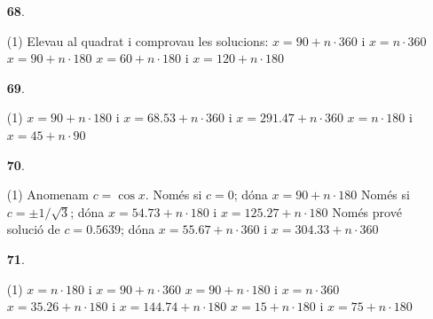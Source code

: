 \documentclass[a4paper, pdf, twoside]{book}
\begin{document}
\begin{multicols}{2}
\begin{enumerate}

 \item[\fontfamily{phv}\selectfont\color{blue}\textbf{68}. ] 
 \begin{tasks}[column-sep=1em, item-indent=1.3333em](1)
	 \task* Elevau al quadrat i comprovau les solucions: $x=90+n\cdot 360$ i $x=n\cdot 360$
	 \task $x=90+n\cdot 180$
	 \task* $x=60+n\cdot 180$ i $x=120+n\cdot 180$
\end{tasks}
\vspace{0.25cm}



 \item[\fontfamily{phv}\selectfont\color{blue}\textbf{69}. ] 
 \begin{tasks}[column-sep=1em, item-indent=1.3333em](1)
	 \task* $x=90+n\cdot 180$ i $x=68.53+n\cdot 360$ i $x=291.47+n\cdot 360$
	 \task* $x=n \cdot 180$ i $x=45+n\cdot 90$
\end{tasks}
\vspace{0.25cm}



 \item[\fontfamily{phv}\selectfont\color{blue}\textbf{70}. ] 
 \begin{tasks}[column-sep=1em, item-indent=1.3333em](1)
	 \task* Anomenam $c=\cos x$. Només si $c=0$; dóna $x=90+n\cdot 180$
	 \task* Només si $c=\pm 1/\sqrt {3}$; dóna $x=54.73+n\cdot 180$ i $x=125.27+n\cdot 180$
	 \task* Només prové solució de $c=0.5639$; dóna $x=55.67+n\cdot 360$ i $x=304.33+n\cdot 360$
\end{tasks}
\vspace{0.25cm}



 \item[\fontfamily{phv}\selectfont\color{blue}\textbf{71}. ] 
 \begin{tasks}[column-sep=1em, item-indent=1.3333em](1)
	 \task* $x=n\cdot 180$ i $x=90+n\cdot 360$
	 \task* $x=90+n\cdot 180$ i $x=n\cdot 360$
	 \task* $x=35.26+n\cdot 180$ i $x=144.74+n\cdot 180$
	 \task* $x=15+n\cdot 180$ i $x=75+n\cdot 180$
\end{tasks}
\vspace{0.25cm}




\end{enumerate}
\end{multicols}
\end{document}
